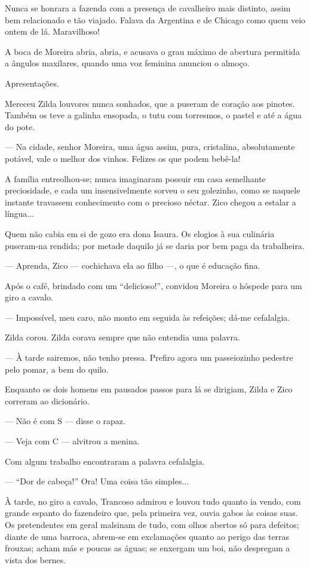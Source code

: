 Nunca se honrara a fazenda com a presença de cavalheiro mais distinto,
assim bem relacionado e tão viajado. Falava da Argentina e de Chicago
como quem veio ontem de lá. Maravilhoso!

A boca de Moreira abria, abria, e acusava o grau máximo de abertura
permitida a ângulos maxilares, quando uma voz feminina anunciou o
almoço.

Apresentações.

Mereceu Zilda louvores nunca sonhados, que a puseram de coração aos
pinotes. Também os teve a galinha ensopada, o tutu com torresmos, o
pastel e até a água do pote.

--- Na cidade, senhor Moreira, uma água assim, pura, cristalina,
absolutamente potável, vale o melhor dos vinhos. Felizes os que podem
bebê-la!

A família entreolhou-se; nunca imaginaram possuir em casa semelhante
preciosidade, e cada um insensivelmente sorveu o seu golezinho, como se
naquele instante travassem conhecimento com o precioso néctar. Zico
chegou a estalar a língua...

Quem não cabia em si de gozo era dona Isaura. Os elogios à sua culinária
puseram-na rendida; por metade daquilo já se daria por bem paga da
trabalheira.

--- Aprenda, Zico --- cochichava ela ao filho ---, o que é educação
fina.

Após o café, brindado com um ``delicioso!'', convidou Moreira o hóspede
para um giro a cavalo.

--- Impossível, meu caro, não monto em seguida às refeições; dá-me
cefalalgia.

Zilda corou. Zilda corava sempre que não entendia uma palavra.

--- À tarde sairemos, não tenho pressa. Prefiro agora um passeiozinho
pedestre pelo pomar, a bem do quilo.

Enquanto os dois homens em pausados passos para lá se dirigiam, Zilda e
Zico correram ao dicionário.

--- Não é com S --- disse o rapaz.

--- Veja com C --- alvitrou a menina.

Com algum trabalho encontraram a palavra cefalalgia.

--- ``Dor de cabeça!'' Ora! Uma coisa tão simples...

À tarde, no giro a cavalo, Trancoso admirou e louvou tudo quanto ia
vendo, com grande espanto do fazendeiro que, pela primeira vez, ouvia
gabos às coisas suas. Os pretendentes em geral malsinam de tudo, com
olhos abertos só para defeitos; diante de uma barroca, abrem-se em
exclamações quanto ao perigo das terras frouxas; acham más e poucas as
águas; se enxergam um boi, não despregam a vista dos bernes.

